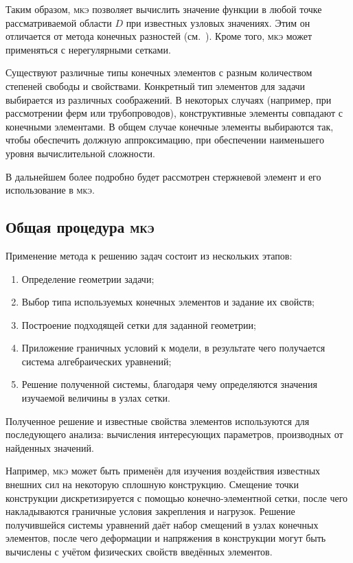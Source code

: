 \documentclass[10pt]{article}
\numberwithin{equation}{section}
\newcommand{\fem}{\textsc{мкэ}}
\begin{document}
Таким образом, \fem{} позволяет вычислить значение функции в любой
точке рассматриваемой области $D$ при известных узловых значениях.
Этим он отличается от метода конечных разностей
(см. \cite{vorozhtsov98}). Кроме того, \fem{} может применяться с
нерегулярными сетками.

Существуют различные типы конечных элементов с разным количеством
степеней свободы и свойствами. Конкретный тип элементов для задачи
выбирается из различных соображений. В некоторых случаях (например,
при рассмотрении ферм или трубопроводов), конструктивные элементы
совпадают с конечными элементами. В общем случае конечные элементы
выбираются так, чтобы обеспечить должную аппроксимацию, при
обеспечении наименьшего уровня вычислительной сложности.

В дальнейшем более подробно будет рассмотрен стержневой элемент и его
использование в \fem{}.

\subsection{Общая процедура \fem{}}

Применение метода к решению задач состоит из нескольких этапов:

\begin{enumerate}
\item Определение геометрии задачи;

\item Выбор типа используемых конечных элементов и задание их свойств;

\item Построение подходящей сетки для заданной геометрии;

\item Приложение граничных условий к модели, в результате чего
  получается система алгебраических уравнений;

\item Решение полученной системы, благодаря чему определяются значения
  изучаемой величины в узлах сетки.
\end{enumerate}

Полученное решение и известные свойства элементов используются для
последующего анализа: вычисления интересующих параметров, производных
от найденных значений.

Например, \fem{} может быть применён для изучения воздействия
известных внешних сил на некоторую сплошную конструкцию. Смещение
точки конструкции дискретизируется с помощью конечно-элементной сетки,
после чего накладываются граничные условия закрепления и нагрузок.
Решение получившейся системы уравнений даёт набор смещений в узлах
конечных элементов, после чего деформации и напряжения в конструкции
могут быть вычислены с учётом физических свойств введённых элементов.
\end{document}
